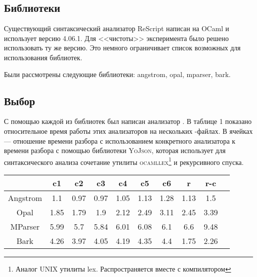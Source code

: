 \subsection{Библиотеки}

Существующий синтаксический анализатор ReScript написан на OCaml и использует версию 4.06.1.
Для <<чистоты>> эксперимента было решено использовать ту же версию.
Это немного ограничивает список возможных для использования библиотек.

Были рассмотрены следующие библиотеки: angstrom, opal, mparser, bark.

\subsection{Выбор}

С помощью каждой из библиотек был написан анализатор \JSON{}.
В таблице 1 показано относительное время работы этих анализаторов на нескольких \JSON{}-файлах.
В ячейках --- отношение времени разбора с использованием конкретного анализатора
к времени разбора с помощью библиотеки \textsc{YoJson}, которая использует для синтаксического анализа \JSON{} сочетание утилиты \textsc{ocamllex}\footnote{Аналог \textsc{UNIX} утилиты lex. Распространяется вместе с компилятором \OCaml{}} и рекурсивного спуска.


\noindent
\begin{center}
    \begin{tabular}{|c|c|c|c|c|c|c|c|c|c|}
        \hline
                           & c1   & c2   & c3   & c4   & c5   & c6   & r    & r-c
        \\\hline
           Angstrom        & 1.1  & 0.97 & 0.97 & 1.05 & 1.13 & 1.28 & 1.13 & 1.5
        \\ Opal            & 1.85 & 1.79 & 1.9  & 2.12 & 2.49 & 3.11 & 2.45 & 3.39
        \\ MParser         & 5.99 & 5.7  & 5.84 & 6.01 & 6.08 & 6.1  & 6.6  & 9.48
        \\ Bark            & 4.26 & 3.97 & 4.05 & 4.19 & 4.35 & 4.4  & 1.75 & 2.26
        \\\hline
    \end{tabular}
\end{center}

